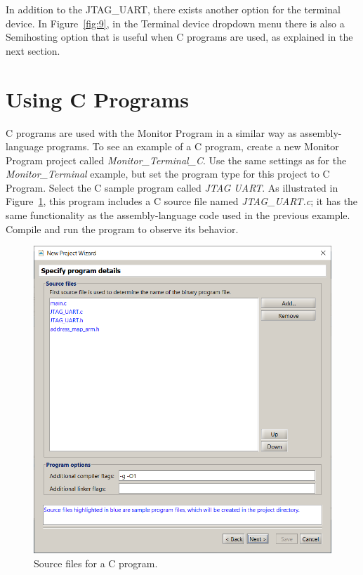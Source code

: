 \documentclass[11pt, twoside, pdftex]{article}
\begin{document}
In addition to the JTAG\_UART, there exists another option for
the terminal device. In Figure~\ref{fig:9}, in the {\sf Terminal device}
dropdown menu there is also a {\sf Semihosting} option that
is useful when C programs are used, as explained in the next section.

\newpage
\section{Using C Programs}
\label{sec:6}

C programs are used with the Monitor Program in a similar way as
assembly-language programs. To see an example of a C program,
create a new Monitor Program project called 
{\it Monitor\_Terminal\_C}. Use the same settings as for the 
{\it Monitor\_Terminal} example, but set the program type for
this project to {\sf C Program}.
Select the C sample program called {\it JTAG UART}.  
As illustrated in Figure~\ref{fig:23}, this program includes a C source
file named {\it JTAG\_UART.c}; it has the same functionality as
the assembly-language code used in the previous example. 
Compile and run the program to observe its behavior.

\begin{figure}[H]
   \begin{center}
      \includegraphics[scale=0.6]{screenshots/figure23.png}
   \end{center}
   \caption{Source files for a C program.}
	 \label{fig:23}
\end{figure}
\end{document}
